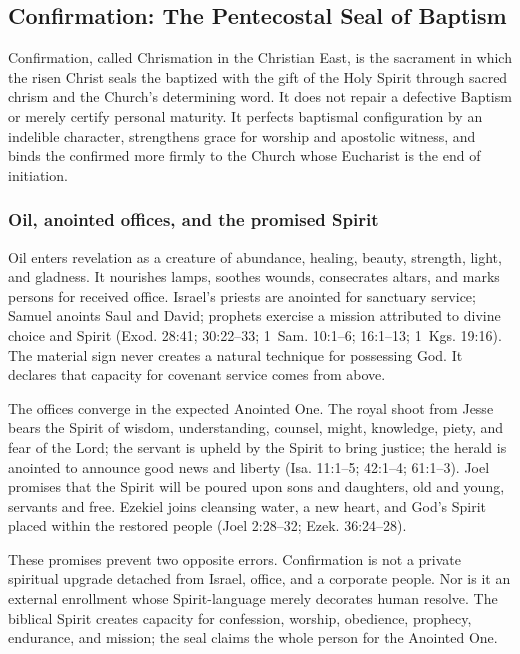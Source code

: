 \subsection{Confirmation: The Pentecostal Seal of Baptism}

Confirmation, called Chrismation in the Christian East, is the sacrament in which the risen Christ seals the baptized with the gift of the Holy Spirit through sacred chrism and the Church's determining word. It does not repair a defective Baptism or merely certify personal maturity. It perfects baptismal configuration by an indelible character, strengthens grace for worship and apostolic witness, and binds the confirmed more firmly to the Church whose Eucharist is the end of initiation.

\subsubsection{Oil, anointed offices, and the promised Spirit}

Oil enters revelation as a creature of abundance, healing, beauty, strength, light, and gladness. It nourishes lamps, soothes wounds, consecrates altars, and marks persons for received office. Israel's priests are anointed for sanctuary service; Samuel anoints Saul and David; prophets exercise a mission attributed to divine choice and Spirit (Exod. 28:41; 30:22--33; 1~Sam. 10:1--6; 16:1--13; 1~Kgs. 19:16). The material sign never creates a natural technique for possessing God. It declares that capacity for covenant service comes from above.

The offices converge in the expected Anointed One. The royal shoot from Jesse bears the Spirit of wisdom, understanding, counsel, might, knowledge, piety, and fear of the Lord; the servant is upheld by the Spirit to bring justice; the herald is anointed to announce good news and liberty (Isa. 11:1--5; 42:1--4; 61:1--3). Joel promises that the Spirit will be poured upon sons and daughters, old and young, servants and free. Ezekiel joins cleansing water, a new heart, and God's Spirit placed within the restored people (Joel 2:28--32; Ezek. 36:24--28).

These promises prevent two opposite errors. Confirmation is not a private spiritual upgrade detached from Israel, office, and a corporate people. Nor is it an external enrollment whose Spirit-language merely decorates human resolve. The biblical Spirit creates capacity for confession, worship, obedience, prophecy, endurance, and mission; the seal claims the whole person for the Anointed One.

